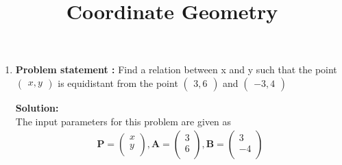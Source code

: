 \documentclass[12pt]{article}
\newcommand{\solution}{\noindent \textbf{Solution: }}
\newcommand{\myvec}[1]{\ensuremath{\begin{pmatrix}#1\end{pmatrix}}}
\let\vec\mathbf
\begin{document}
\begin{center}
\title{\textbf{Coordinate Geometry}}
\date{\vspace{-5ex}} %
\maketitle
\end{center}

\setcounter{page}{1}



\begin{enumerate}

\item\textbf{Problem statement :} Find a relation between x and y such that the point $\myvec{x ,y}$ is equidistant from the point $\myvec{3 ,6}$ and $\myvec{-3 ,4}$

\solution \\
\textbf{}
\fi
The input parameters for this problem are given as
	\begin{align}
	\vec{P} = \myvec{
		x\\
		y\\
		},
	\vec{A} = \myvec{
		3\\
		6\\
		},
        \vec{B} = \myvec{
		3\\
		-4\\
		}
	\end{align}
\iffalse


\end{enumerate}
\end{document}
